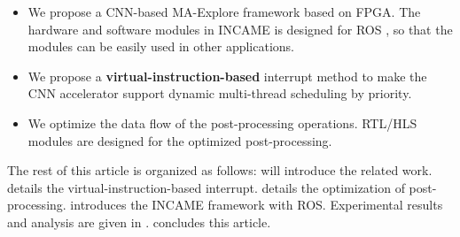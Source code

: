 \begin{itemize}
\item We propose a CNN-based MA-Explore framework based on FPGA. The hardware and software modules in INCAME is designed for ROS \cite{quigley2009ros}, so that the modules can be easily used in other applications.
\item We propose a \textbf{virtual-instruction-based} interrupt method to make the CNN accelerator support dynamic multi-thread scheduling by priority.
\item We optimize the data flow of the post-processing operations. RTL/HLS modules are designed for the optimized post-processing.
\end{itemize}

The rest of this article is organized as follows:  will introduce the related work.  details the {virtual-instruction-based} interrupt.  details the optimization of post-processing.  introduces the INCAME framework with ROS. Experimental results and analysis are given in .  concludes this article.